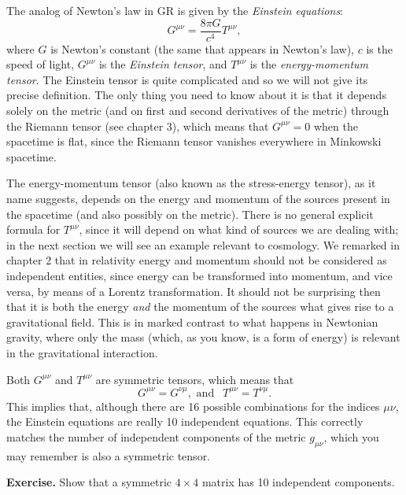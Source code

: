 The analog of Newton's law in GR is given by the {\it Einstein equations}:
\begin{equation} \label{eq:einstein_eqs}
G^{\mu\nu}=\frac{8\pi G}{c^4}T^{\mu\nu},
\end{equation}
where $G$ is Newton's constant (the same that appears in Newton's law), $c$ is the speed of light, $G^{\mu\nu}$ is the {\it Einstein tensor}, and $T^{\mu\nu}$ is the {\it energy-momentum tensor}. The Einstein tensor is quite complicated and so we will not give its precise definition. The only thing you need to know about it is that it depends solely on the metric (and on first and second derivatives of the metric) through the Riemann tensor (see chapter 3), which means that $G^{\mu\nu}=0$ when the spacetime is flat, since the Riemann tensor vanishes everywhere in Minkowski spacetime.

The energy-momentum tensor (also known as the stress-energy tensor), as it name suggests, depends on the energy and momentum of the sources present in the spacetime (and also possibly on the metric). There is no general explicit formula for $T^{\mu\nu}$, since it will depend on what kind of sources we are dealing with; in the next section we will see an example relevant to cosmology. We remarked in chapter 2 that in relativity energy and momentum should not be considered as independent entities, since energy can be transformed into momentum, and vice versa, by means of a Lorentz transformation. It should not be surprising then that it is both the energy {\it and} the momentum of the sources what gives rise to a gravitational field. This is in marked contrast to what happens in Newtonian gravity, where only the mass (which, as you know, is a form of energy) is relevant in the gravitational interaction.

Both $G^{\mu\nu}$ and $T^{\mu\nu}$ are symmetric tensors, which means that
\begin{equation}
G^{\mu\nu}=G^{\nu\mu},\mbox{ and }~~T^{\mu\nu}=T^{\nu\mu}.
\end{equation}
This implies that, although there are 16 possible combinations for the indices $\mu\nu$, the Einstein equations are really 10 independent equations. This correctly matches the number of independent components of the metric $g_{\mu\nu}$, which you may remember is also a symmetric tensor.

\par\vspace{\baselineskip}

{\bf Exercise.} Show that a symmetric $4\times4$ matrix has 10 independent components.

